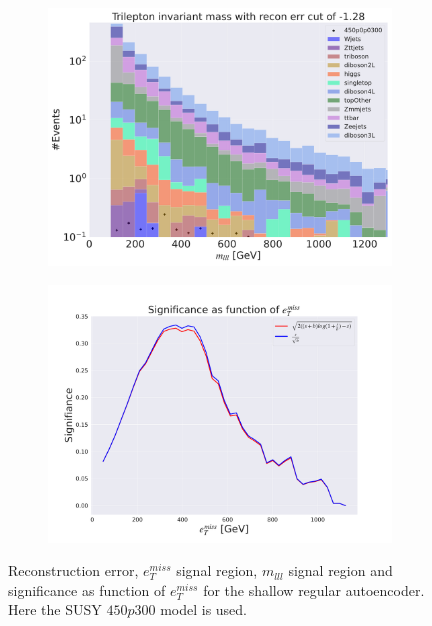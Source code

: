 \begin{figure}[H]
    \hfill
    \begin{subfigure}{.49\textwidth}
        \includegraphics[width=\textwidth]{Figures/AE_testing/small/3lep/b_data_recon_big_rm3_feats_sig_450p0p0300_mlll_recon_errcut_-1.28.pdf}
        \caption{}
        \label{fig:AE_3lep_small_mlll_450_2}
    \end{subfigure}
    \hfill   
    \begin{subfigure}{.49\textwidth}
        \includegraphics[width=\textwidth]{Figures/AE_testing/small/3lep/significance_etmiss_450p0p0300_-1.2800970222462997.pdf}
        \caption{}
        \label{fig:AE_3lep_small_signi_450_2}
    \end{subfigure}
    \hfill      
    \caption[3lep shallow network | $450p300$ | AE | 2]{Reconstruction error, $e_T^{miss}$ signal region, $m_{lll}$ signal region and significance as function of 
    $e_T^{miss}$ for the shallow regular autoencoder. Here the SUSY $450p300$ model is used.}
    \label{fig:AE_3lep_small_rec_sig_signi_450_2}
\end{figure}








